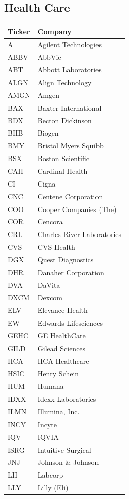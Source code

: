 \documentclass[11pt,a4paper]{article}
\begin{document}
\subsection{Health Care}
{\small
\begin{longtable}{lp{11cm}}
\hline
Ticker & Company \\
\hline
\endhead
A & Agilent Technologies \\
ABBV & AbbVie \\
ABT & Abbott Laboratories \\
ALGN & Align Technology \\
AMGN & Amgen \\
BAX & Baxter International \\
BDX & Becton Dickinson \\
BIIB & Biogen \\
BMY & Bristol Myers Squibb \\
BSX & Boston Scientific \\
CAH & Cardinal Health \\
CI & Cigna \\
CNC & Centene Corporation \\
COO & Cooper Companies (The) \\
COR & Cencora \\
CRL & Charles River Laboratories \\
CVS & CVS Health \\
DGX & Quest Diagnostics \\
DHR & Danaher Corporation \\
DVA & DaVita \\
DXCM & Dexcom \\
ELV & Elevance Health \\
EW & Edwards Lifesciences \\
GEHC & GE HealthCare \\
GILD & Gilead Sciences \\
HCA & HCA Healthcare \\
HSIC & Henry Schein \\
HUM & Humana \\
IDXX & Idexx Laboratories \\
ILMN & Illumina, Inc. \\
INCY & Incyte \\
IQV & IQVIA \\
ISRG & Intuitive Surgical \\
JNJ & Johnson \& Johnson \\
LH & Labcorp \\
LLY & Lilly (Eli) \\

\end{longtable}}
\end{document}

